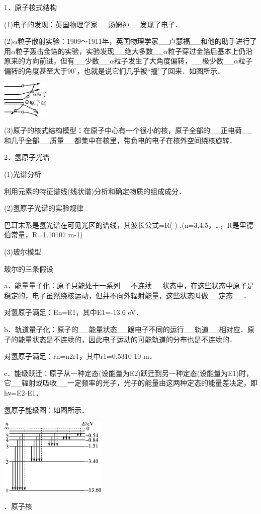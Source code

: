 1．原子核式结构

(1)电子的发现：英国物理学家\_\_汤姆孙\_\_发现了电子．

(2)$\alpha$粒子散射实验：1909～1911年，英国物理学家\_\_卢瑟福\_\_和他的助手进行了用$\alpha$粒子轰击金箔的实验，实验发现\_\_绝大多数\_\_$\alpha$粒子穿过金箔后基本上仍沿原来的方向前进，但有\_\_少数\_\_$\alpha$粒子发生了大角度偏转，\_\_极少数\_\_$\alpha$粒子偏转的角度甚至大于$90^\circ$，也就是说它们几乎被``撞''了回来．如图所示．

\begin{center}\includegraphics[width=0.89653in,height=0.68889in]{media/image477.png}\end{center}

(3)原子的核式结构模型：在原子中心有一个很小的核，原子全部的\_\_正电荷\_\_和几乎全部\_\_质量\_\_都集中在核里，带负电的电子在核外空间绕核旋转．

2．氢原子光谱

(1)光谱分析

利用元素的特征谱线(线状谱)分析和确定物质的组成成分．

(2)氢原子光谱的实验规律

巴耳末系是氢光谱在可见光区的谱线，其波长公式=R(-)
.(n=3,4,5，\ldots，R是里德伯常量，R=1.10107 m-1)

(3)玻尔模型

玻尔的三条假设

a．能量量子化：原子只能处于一系列\_\_不连续\_\_状态中，在这些状态中原子是稳定的，电子虽然绕核运动，但并不向外辐射能量，这些状态叫做\_\_定态\_\_．

对氢原子满足：En=E1，其中E1=-13.6 eV．

b．轨道量子化：原子的\_\_能量状态\_\_跟电子不同的运行\_\_轨道\_\_相对应．原子的能量状态是不连续的，因此电子运动的可能轨道的分布也是不连续的．

对氢原子满足：rn=n2r1，其中r1=0.5310-10 m．

c．能级跃迁：原子从一种定态(设能量为E2)跃迁到另一种定态(设能量为E1)时，它\_\_辐射或吸收\_\_一定频率的光子，光子的能量由这两种定态的能量差决定，即hν=E2-E1．

氢原子能级图：如图所示．

\begin{center}\includegraphics[width=2.00972in,height=1.45278in]{media/image478.png}\end{center}
．原子核

